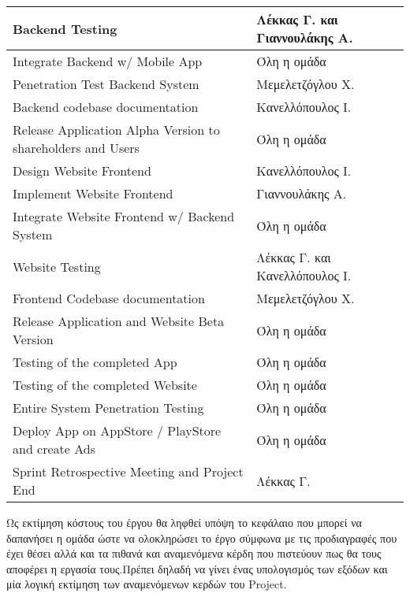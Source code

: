 \documentclass{../ol-softwaremanual}
\begin{document}
\begin{longtable}{| p{} | p{} |}
			\hline
			\en Backend Testing \gr       & Λέκκας Γ. και Γιαννουλάκης Α.       \\
			\hline
			\en Integrate Backend w/ Mobile App \gr       &  Όλη η ομάδα         \\
			\hline
			\en Penetration Test Backend System \gr       &  Μεμελετζόγλου Χ.        \\
			\hline
			\en Backend codebase documentation \gr       &  Κανελλόπουλος Ι.        \\
			\hline
			\en Release Application Alpha Version to shareholders and Users \gr       &  Όλη η ομάδα        \\
			\hline
			\en Design Website Frontend \gr       &  Κανελλόπουλος Ι.        \\
			\hline
			\en Implement Website Frontend \gr       &  Γιαννουλάκης Α.        \\
			\hline
			\en Integrate Website Frontend w/ Backend System \gr       &  Όλη η ομάδα        \\
			\hline
			\en Website Testing \gr       &  Λέκκας Γ. και Κανελλόπουλος Ι.       \\
			\hline
			\en Frontend Codebase documentation \gr       &  Μεμελετζόγλου Χ.       \\
			\hline
			\en Release Application and Website Beta Version \gr       &  Όλη η ομάδα        \\
			\hline
			\en Testing of the completed App \gr       &  Όλη η ομάδα        \\
			\hline
			\en Testing of the completed Website \gr       &   Όλη η ομάδα        \\
			\hline
			\en Entire System Penetration Testing \gr       &   Όλη η ομάδα        \\
			\hline
			\en Deploy App on AppStore / PlayStore and create Ads \gr       &   Όλη η ομάδα       \\
			\hline
			\en Sprint Retrospective Meeting and Project End \gr       &  Λέκκας Γ.        \\
			\hline
	\end{longtable}
	
	\vspace{30pt}
	
	
	
	\vspace{20pt}
	
	\flushleft
	Ως εκτίμηση κόστους του έργου θα ληφθεί υπόψη το κεφάλαιο που μπορεί να δαπανήσει η ομάδα ώστε να ολοκληρώσει το έργο σύμφωνα με τις προδιαγραφές που έχει θέσει αλλά και τα πιθανά και αναμενόμενα κέρδη που πιστεύουν πως θα τους αποφέρει η εργασία τους.Πρέπει δηλαδή να γίνει ένας υπολογισμός των εξόδων και μία λογική εκτίμηση των αναμενόμενων κερδών του \en Project.\gr \\
	
\end{document}
